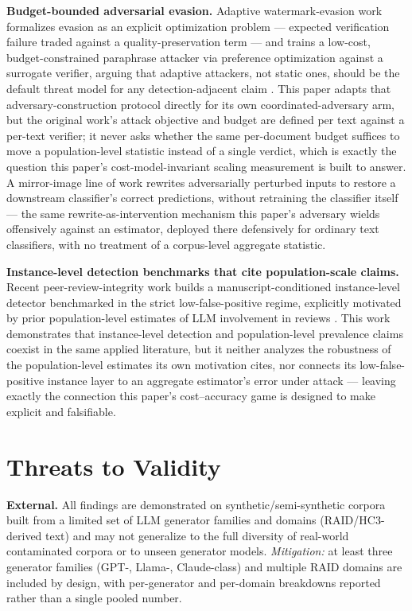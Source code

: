 \documentclass[11pt]{article}
\begin{document}
\textbf{Budget-bounded adversarial evasion.} Adaptive watermark-evasion work formalizes evasion as an explicit optimization problem --- expected verification failure traded against a quality-preservation term --- and trains a low-cost, budget-constrained paraphrase attacker via preference optimization against a surrogate verifier, arguing that adaptive attackers, not static ones, should be the default threat model for any detection-adjacent claim \citep{AdaptiveWMAttack}. This paper adapts that adversary-construction protocol directly for its own coordinated-adversary arm, but the original work's attack objective and budget are defined per text against a per-text verifier; it never asks whether the same per-document budget suffices to move a population-level statistic instead of a single verdict, which is exactly the question this paper's cost-model-invariant scaling measurement is built to answer. A mirror-image line of work rewrites adversarially perturbed inputs to restore a downstream classifier's correct predictions, without retraining the classifier itself \citep{ATINTER2023} --- the same rewrite-as-intervention mechanism this paper's adversary wields offensively against an estimator, deployed there defensively for ordinary text classifiers, with no treatment of a corpus-level aggregate statistic.

\textbf{Instance-level detection benchmarks that cite population-scale claims.} Recent peer-review-integrity work builds a manuscript-conditioned instance-level detector benchmarked in the strict low-false-positive regime, explicitly motivated by prior population-level estimates of LLM involvement in reviews \citep{AnchorPeerReview}. This work demonstrates that instance-level detection and population-level prevalence claims coexist in the same applied literature, but it neither analyzes the robustness of the population-level estimates its own motivation cites, nor connects its low-false-positive instance layer to an aggregate estimator's error under attack --- leaving exactly the connection this paper's cost--accuracy game is designed to make explicit and falsifiable.

\section{Threats to Validity}

\textbf{External.} All findings are demonstrated on synthetic/semi-synthetic corpora built from a limited set of LLM generator families and domains (RAID/HC3-derived text) and may not generalize to the full diversity of real-world contaminated corpora or to unseen generator models. \emph{Mitigation:} at least three generator families (GPT-, Llama-, Claude-class) and multiple RAID domains are included by design, with per-generator and per-domain breakdowns reported rather than a single pooled number.
\end{document}
